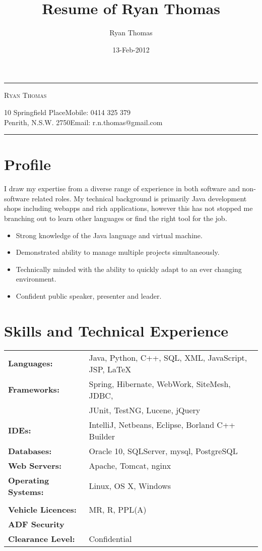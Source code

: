 \documentclass[a4paper]{article}
\author{Ryan Thomas}
\title{Resume of Ryan Thomas}
\date{13-Feb-2012}
\begin{document}
\newcommand{\ryanHeader}{
\begin{center}
\rule{14.1cm}{0.5mm}
\end{center}
\vspace{-0.6cm}
\begin{center}
\textsc{Ryan Thomas}
\end{center}
\vspace{-0.3cm}
10 Springfield Place\hfill Mobile: 0414 325 379~~\\
Penrith, N.S.W. 2750\hfill Email: r.n.thomas@gmail.com
\vspace{-0.3cm}
\begin{center}
\rule{14.1cm}{0.5mm}
\end{center}}
\ryanHeader
\section*{Profile}
I draw my expertise from a diverse range of experience in both software and non-software related roles. My technical background is primarily Java development shops including webapps and rich applications, however this has not stopped me branching out to learn other languages or find the right tool for the job.
\begin{itemize}
\item Strong knowledge of the Java language and virtual machine.
\item Demonstrated ability to manage multiple projects simultaneously.
\item Technically minded with the ability to quickly adapt to an ever changing environment.
\item Confident public speaker, presenter and leader.
\end{itemize}
\section*{Skills and Technical Experience}
\begin{tabular}{l l}
\textbf{Languages:} & Java, Python, C++, SQL, XML, JavaScript, JSP, \LaTeX\\
\textbf{Frameworks:} & Spring, Hibernate, WebWork, SiteMesh, JDBC, \\&JUnit, TestNG, Lucene, jQuery\\
\textbf{IDEs:} & IntelliJ, Netbeans, Eclipse, Borland C++ Builder\\
\textbf{Databases:} & Oracle 10, SQLServer, mysql, PostgreSQL\\
\textbf{Web Servers:} & Apache, Tomcat, nginx\\
\textbf{Operating Systems:} & Linux, OS X, Windows\\\\
\textbf{Vehicle Licences:}&MR, R, PPL(A)\\
\textbf{ADF Security}&\\\textbf{Clearance Level:}&Confidential\\
\end{tabular}
\vspace{5pt}
\end{document}
